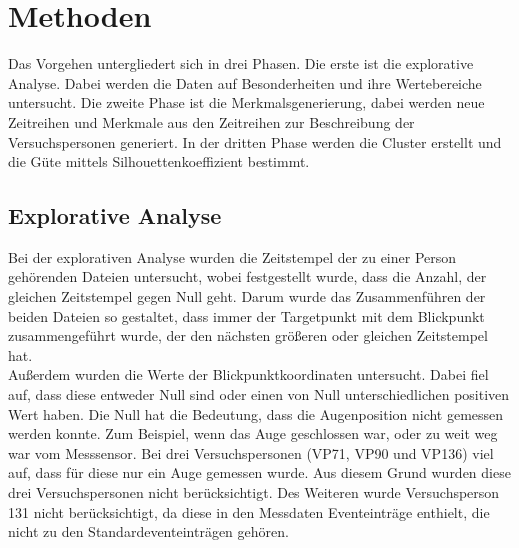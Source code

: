 \documentclass[12pt]{article}
\begin{document}
\section*{Methoden}
Das Vorgehen untergliedert sich in drei Phasen. Die erste ist die explorative Analyse. Dabei werden die Daten auf Besonderheiten und ihre Wertebereiche untersucht. Die zweite Phase ist die Merkmalsgenerierung, dabei werden neue Zeitreihen und Merkmale aus den Zeitreihen zur Beschreibung der Versuchspersonen generiert. In der dritten Phase werden die Cluster erstellt und die G\"ute mittels Silhouettenkoeffizient bestimmt.

\subsection*{Explorative Analyse}
Bei der explorativen Analyse wurden die Zeitstempel der zu einer Person geh\"orenden Dateien untersucht, wobei festgestellt wurde, dass die Anzahl, der gleichen Zeitstempel gegen Null geht. Darum wurde das Zusammenf\"uhren der beiden Dateien so gestaltet, dass immer der Targetpunkt mit dem Blickpunkt zusammengef\"uhrt wurde, der den n\"achsten gr\"o\ss{}eren oder gleichen Zeitstempel hat.\\
Au\ss{}erdem wurden die Werte der Blickpunktkoordinaten untersucht. Dabei fiel auf, dass diese entweder Null sind oder einen von Null unterschiedlichen positiven Wert haben. Die Null hat die Bedeutung, dass die Augenposition nicht gemessen werden konnte. Zum Beispiel, wenn das Auge geschlossen war, oder zu weit weg war vom Messsensor. Bei drei Versuchspersonen (VP71, VP90 und VP136) viel auf, dass f\"ur diese nur ein Auge gemessen wurde. Aus diesem Grund wurden diese drei Versuchspersonen nicht ber\"ucksichtigt. Des Weiteren wurde Versuchsperson 131 nicht ber\"ucksichtigt, da diese in den Messdaten Eventeintr\"age enthielt, die nicht zu den Standardeventeintr\"agen geh\"oren.
\end{document}
